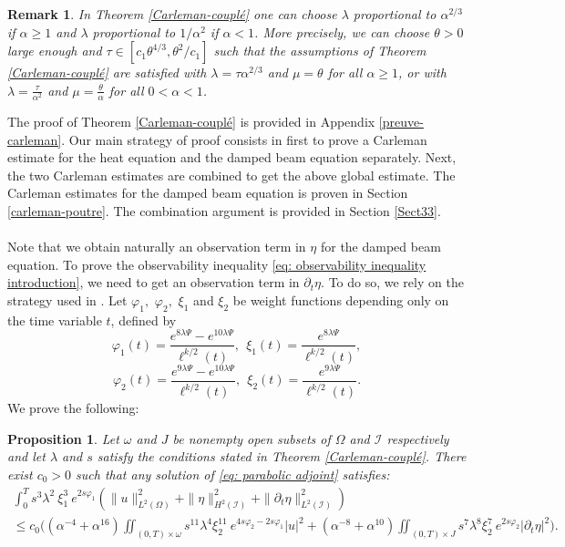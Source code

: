\documentclass[a4paper, 12pt]{article}
\theoremstyle{plain}
\newtheorem{proposition}[theorem]{Proposition}
\newtheorem{remark}[theorem]{Remark}
\theoremstyle{definition}
\numberwithin{theorem}{section}
\numberwithin{equation}{section}
\begin{document}
\begin{remark}\label{RqCarleman-couplé} 
In Theorem \ref{Carleman-couplé} one can choose $\lambda$ proportional to $\alpha^{2/3}$ if $\alpha\geq 1$  and $\lambda$ proportional to $1/\alpha^{2}$ if $\alpha<1$. More precisely, we can choose $\theta>0$ large enough
 and $\tau\in [c_1\theta^{4/3}, \theta^2/c_1]$ such that the assumptions of Theorem \ref{Carleman-couplé} are satisfied with $\lambda=\tau\alpha^{2/3}$ and $\mu=\theta$ for all $\alpha\geq 1$, or with $\lambda=\frac{\tau}{\alpha^2}$ and $\mu=\frac{\theta}{\alpha}$ for all $0<\alpha<1$. 
\end{remark}

The proof of Theorem \ref{Carleman-couplé} is provided in Appendix \ref{preuve-carleman}.
Our main strategy of proof consists in first to prove a Carleman estimate for the heat equation and the damped beam equation separately. Next, the two Carleman estimates are combined to get the above global estimate.
 The Carleman estimates for the damped beam equation is proven in Section \ref{carleman-poutre}.
 The combination argument is provided in Section \ref{Sect33}.
\\
\\
Note that we obtain naturally an observation term in $\eta$ for the damped beam equation. To prove the observability inequality \eqref{eq: observability inequality introduction}, we need to get an observation term in $\partial_t\eta.$ To do so, we rely on the strategy used in \cite[Section 5]{Buffe}.
Let $\varphi_1,$ $\varphi_2,$ $\xi_1$ and $\xi_2$ be weight functions depending only on the time variable $t$, defined by
\begin{equation*}\label{poids en t1_intro}
\varphi_1(t)=\frac{e^{8\lambda\Psi}-e^{10\lambda\Psi}}{\ell^{k/2}(t)},~~\xi_1(t)=\frac{e^{8\lambda\Psi}}{\ell^{k/2}(t)},
\end{equation*}
\begin{equation*}\label{poids en t2_intro}
\varphi_2(t)=\frac{e^{9\lambda\Psi}-e^{10\lambda\Psi}}{\ell^{k/2}(t)},~~\xi_2(t)=\frac{e^{9\lambda\Psi}}{\ell^{k/2}(t)}.
\end{equation*}
We prove the following:
\begin{proposition}\label{obs-dteta}
Let $\omega$ and $J$ be nonempty open subsets of $\Omega$ and $\mathcal{I}$ respectively and let $\lambda$ and $s$ satisfy the conditions stated in Theorem \ref{Carleman-couplé}. There exist $c_0>0$ such that any solution of \eqref{eq: parabolic adjoint} satisfies:
\begin{multline}\label{dteta}
\int_0^Ts^{3}\lambda^2~\xi^{3}_1~e^{2s\varphi_1}\left(\|u\|^2_{L^2(\Omega)}+\|\eta\|^2_{H^2(\mathcal{I})}+\|\partial_t\eta\|^2_{L^2(\mathcal{I})}\right)\\
\leq c_0\Big( (\alpha^{-4}+\alpha^{16})\iint_{(0,T)\times\omega}s^{11}\lambda^{4}\xi_2^{11}~e^{4s\varphi_2-2s\varphi_1} |u|^2
+ (\alpha^{-8}+\alpha^{10})\iint_{(0,T)\times J}s^{7}\lambda^8\xi_2^{7}~e^{2s\varphi_2}|\partial_t\eta|^2\Big).
\end{multline}
\end{proposition}
\end{document}
